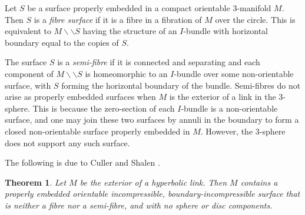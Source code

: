 \documentclass[oneside]{amsart}
\numberwithin{equation}{section}
\theoremstyle{plain}
\newtheorem{theorem}[equation]{Theorem}
\theoremstyle{definition}
\newcommand{\cut}{\backslash\backslash}
\begin{document}
Let $S$ be a surface properly embedded in a compact orientable 3-manifold $M$.
Then $S$ is a \emph{fibre surface} if it is a fibre in a fibration of $M$ over the circle.
This is equivalent to $M \cut S$ having the structure of an $I$-bundle with horizontal boundary equal to the
copies of $S$. 

The surface $S$ is a \emph{semi-fibre} if it  is connected and separating and each component of $M \cut S$ is homeomorphic
to an $I$-bundle over some non-orientable surface, with $S$ forming the horizontal boundary of the bundle. 
Semi-fibres do not arise as properly embedded surfaces when
$M$ is the exterior of a link in the 3-sphere. This is because the zero-section of each $I$-bundle is a non-orientable surface,
and one may join these two surfaces by annuli in the boundary to form a closed non-orientable surface properly embedded in $M$.
However, the 3-sphere does not support any such surface.

The following is due to Culler and Shalen \cite{CullerShalen}.

\begin{theorem}
\label{Thm:NotFibreSemiFibre}
Let $M$ be the exterior of a hyperbolic link. Then $M$
contains a properly embedded orientable incompressible, boundary-incompressible surface that
is neither a fibre nor a semi-fibre, and with no sphere or disc components.
\end{theorem}
\end{document}
